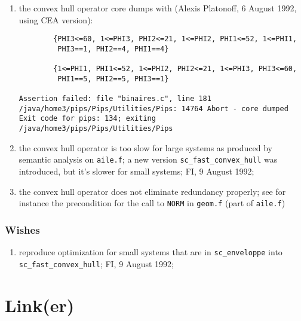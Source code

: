 \begin{enumerate}

  \item the convex hull operator core dumps with (Alexis Platonoff,
        6 August 1992, using CEA version):

\begin{verbatim}
        {PHI3<=60, 1<=PHI3, PHI2<=21, 1<=PHI2, PHI1<=52, 1<=PHI1,
         PHI3==1, PHI2==4, PHI1==4}

        {1<=PHI1, PHI1<=52, 1<=PHI2, PHI2<=21, 1<=PHI3, PHI3<=60,
         PHI1==5, PHI2==5, PHI3==1}

Assertion failed: file "binaires.c", line 181
/java/home3/pips/Pips/Utilities/Pips: 14764 Abort - core dumped
Exit code for pips: 134; exiting /java/home3/pips/Pips/Utilities/Pips
\end{verbatim}

  \item the convex hull operator is too slow for large systems as produced
        by semantic analysis on \verb+aile.f+; a new version
        \verb+sc_fast_convex_hull+ was introduced, but it's slower
        for small systems; FI, 9 August 1992;

  \item the convex hull operator does not eliminate redundancy properly;
        see for instance the precondition for the call to \verb+NORM+
        in \verb+geom.f+ (part of \verb+aile.f+)

\end{enumerate}

\subsubsection{Wishes}

\begin{enumerate}

  \item reproduce optimization for small systems that are in 
        \verb+sc_enveloppe+ into \verb+sc_fast_convex_hull+;
        FI, 9 August 1992;

\end{enumerate}


\section{Link(er)}

